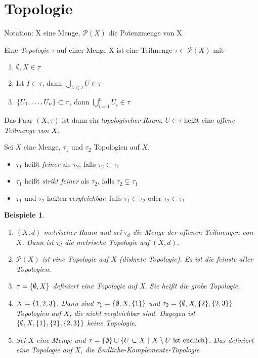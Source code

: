 \section{Topologie}

Notation: X eine Menge, $\mathcal{P}(X)$ die Potenzmenge von X.

\begin{dfn}
    Eine \emph{Topologie} $\tau$ auf einer Menge X ist eine Teilmenge
    $\tau\subset\mathcal{P}(X)$ mit
    \begin{enumerate}
        \item $\emptyset, X \in \tau$
        \item Ist $I\subset \tau$, dann $\bigcup_{U\in I} U \in\tau$
        \item $\mdef{U_1, \ldots, U_n} \subset \tau$, dann
            $\bigcup_{i=1}^n U_i \in \tau$
    \end{enumerate}
    Das Paar $(X, \tau)$ ist dann ein \emph{topologischer Raum}, $U\in\tau$ heißt
    eine \emph{offene Teilmenge von $X$}.
\end{dfn}

\begin{dfn}
    Sei $X$ eine Menge, $\tau_1$ und $\tau_2$ Topologien auf $X$.
    \begin{itemize}
        \item $\tau_1$ heißt \emph{feiner} als $\tau_2$, falls $\tau_2\subset\tau_1$
        \item $\tau_1$ heißt \emph{strikt feiner} als $\tau_2$, falls
            $\tau_2\subsetneq\tau_1$
        \item $\tau_1$ und $\tau_2$ heißen \emph{vergleichbar}, falls
            $\tau_1\subset\tau_2$ oder $\tau_2\subset\tau_1$
    \end{itemize}
\end{dfn}

\newtheorem{bsps}[dfn]{Beispiele}
\begin{bsps}
    \begin{enumerate}
        \item $(X,d)$ metrischer Raum und sei $\tau_d$ die Menge der offenen
            Teilmengen von $X$. Dann ist $\tau_d$ die \emph{metrische Topologie}
            auf $(X,d)$.
        \item $\mathcal{P}(X)$ ist eine Topologie auf $X$ (diskrete Topologie). Es 
            ist die feinste aller Topologien.
        \item $\tau = \mdef{\emptyset, X}$ definiert eine Topologie auf X. Sie
            heißt die \emph{grobe Topologie}.
        \item $X=\mdef{1,2,3}$. Dann sind $\tau_1=\mdef{\emptyset,X,\mdef{1}}$ und
            $\tau_2=\mdef{\emptyset, X, \mdef{2}, \mdef{2,3}}$ Topologien auf $X$,
            die nicht vergleichbar sind. Dagegen ist
            $\mdef{\emptyset, X, \mdef{1}, \mdef{2}, \mdef{2,3}}$ keine Topologie.
        \item Sei $X$ eine Menge und
            $\tau = \mdef{\emptyset}\cup\mdef[U\subset X]{X\setminus U \ \text{ist endlich}}$.
            Das definiert eine Topologie auf $X$, die \emph{Endliche-Komplemente-Topologie}
    \end{enumerate}
\end{bsps}

